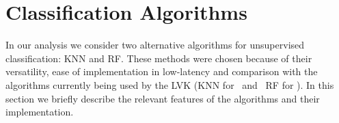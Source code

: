 \section{Classification Algorithms\label{algos}}

In our analysis we consider two alternative algorithms for unsupervised classification: \ac{KNN} and \ac{RF}. These methods were chosen because of their versatility, ease of implementation in low-latency and comparison with the algorithms currently being used by the \ac{LVK} (\ac{KNN} for \hasns\ and \hasrem\, \ac{RF} for \hasgap).
In this section we briefly describe the relevant features of the algorithms and their implementation. 




